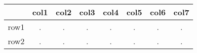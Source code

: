 \documentclass{article}
\newcommand{\ra}{\rand0.\arabic{rand}}
\begin{document}
\begin{table}[ht]
\centering
\begin{tabular}{c|ccccccc}
\hline
& col1 & col2 & col3 & col4 & col5 & col6 & col7 \\
\hline
\rowcolor{LightCyan}
row1& \ra & \ra & \ra & \ra & \ra & \ra & \ra \\
row2& \ra & \ra & \ra & \ra & \ra & \ra & \ra \\
\hline
\end{tabular}
\end{table}
\end{document}
